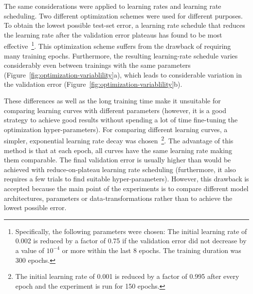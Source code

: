 The same considerations were applied to learning rates and learning rate scheduling. Two different optimization schemes were used for different purposes.
To obtain the lowest possible test-set error, a learning rate schedule that reduces the learning rate after the validation error plateaus has found to be most effective~\footnote{\label{fn:reduce-on-plateu}
	Specifically, the following parameters were chosen: The initial learning rate of 0.002 is reduced by a factor of 0.75 if the validation error did not decrease by a value of $10^{-4}$ or more within the last 8 epochs. The training duration was 300 epochs.
}. This optimization scheme suffers from the drawback of requiring many training epochs. Furthermore, the resulting learning-rate schedule varies considerably even between trainings with the same parameters (Figure~\ref{fig:optimization-variablility}a), which leads to considerable variation in the validation error (Figure~\ref{fig:optimization-variablility}b).

These differences as well as the long training time make it unsuitable for comparing learning curves with different parameters (however, it is a good strategy to achieve good results without spending a lot of time fine-tuning the optimization hyper-parameters).
For comparing different learning curves, a simpler, exponential learning rate decay was chosen~\footnote{
	The initial learning rate of 0.001 is reduced by a factor of 0.995 after every epoch and the experiment is run for 150 epochs.
}. The advantage of this method is that at each epoch, all curves have the same learning rate making them comparable. The final validation error is usually higher than would be achieved with reduce-on-plateau learning rate scheduling (furthermore, it also requires a few trials to find suitable hyper-parameters). However, this drawback is accepted because the main point of the experiments is to compare different model architectures, parameters or data-transformations rather than to achieve the lowest possible error.

